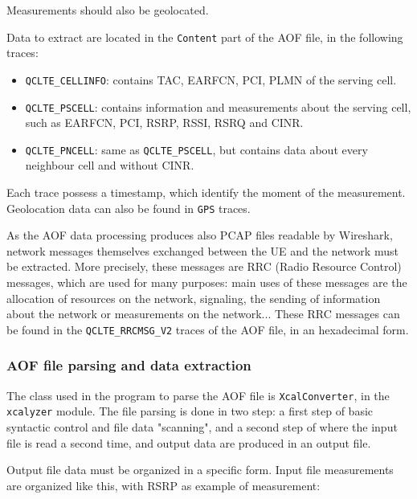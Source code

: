 \documentclass[a4paper, 11pt]{report}
\begin{document}
    Measurements should also be geolocated.
    
    Data to extract are located in the \texttt{Content} part of the AOF file, in the following traces:
    
    \begin{itemize}
        \item \texttt{QCLTE\_CELLINFO}: contains TAC, EARFCN, PCI, PLMN of the serving cell.
        \item \texttt{QCLTE\_PSCELL}: contains information and measurements about the serving cell, such as EARFCN, PCI, RSRP, RSSI, RSRQ and CINR.
        \item \texttt{QCLTE\_PNCELL}: same as \texttt{QCLTE\_PSCELL}, but contains data about every neighbour cell and without CINR.
    \end{itemize}
    
    Each trace possess a timestamp, which identify the moment of the measurement. Geolocation data can also be found in \texttt{GPS} traces. \newline
    
    As the AOF data processing produces also PCAP files readable by Wireshark, network messages themselves exchanged between the UE and the network must be extracted. More precisely, these messages are RRC (Radio Resource Control) messages, which are used for many purposes: main uses of these messages are the allocation of resources on the network, signaling, the sending of information about the network or measurements on the network... \cite{bouguen_lte_2012}
    These RRC messages can be found in the \texttt{QCLTE\_RRCMSG\_V2} traces of the AOF file, in an hexadecimal form.
    
    \subsubsection{AOF file parsing and data extraction}
    The class used in the program to parse the AOF file is \texttt{XcalConverter}, in the \texttt{xcalyzer} module. The file parsing is done in two step: a first step of basic syntactic control and file data "scanning", and a second step of where the input file is read a second time, and output data are produced in an output file. \newline
    
    Output file data must be organized in a specific form. Input file measurements are organized like this, with RSRP as example of measurement:
    
\end{document}
